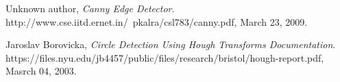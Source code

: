 \begin{thebibliography}{9}

  Unknown author,
  \emph{Canny Edge Detector}.
  http://www.cse.iitd.ernet.in/~pkalra/csl783/canny.pdf,
  March 23, 2009.

  Jaroslav Borovicka,
  \emph{Circle Detection Using Hough Transforms Documentation}.
  https://files.nyu.edu/jb4457/public/files/research/bristol/hough-report.pdf,
  Masrch 04, 2003.


\end{thebibliography}